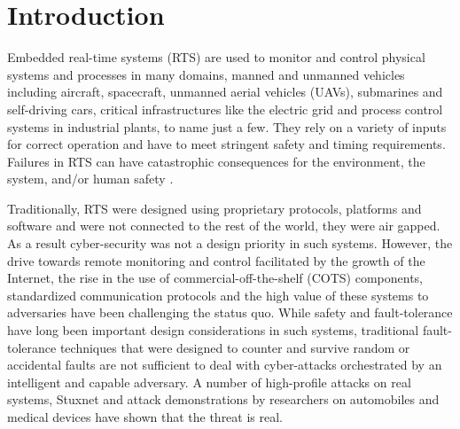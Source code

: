\documentclass[../rt_server_main.tex]{subfiles}
\begin{document}
\section{Introduction}

Embedded real-time systems (RTS) are used to monitor and control physical
systems and processes in many domains, \eg manned and unmanned vehicles
including aircraft, spacecraft, unmanned aerial vehicles (UAVs), submarines and
self-driving cars, critical infrastructures like the electric grid and process control systems in industrial plants, to name just a few.	
They rely on a variety of inputs for 
correct operation and have to meet stringent safety and timing requirements.
Failures in RTS can have catastrophic consequences for the
environment, the system, and/or human safety \cite{abrams2008malicious, checkoway2011comprehensive}. 

Traditionally, RTS were designed using proprietary protocols, platforms and software and were
not connected to the rest of the world, \ie they were air gapped. As a result cyber-security
was not a design priority in such systems.
However, the drive towards remote monitoring and control
facilitated by the growth of the Internet, the rise in the use of
commercial-off-the-shelf (COTS) components, standardized communication protocols
and the high value of these systems to adversaries have been challenging the status
quo. While safety and fault-tolerance have long been important design
considerations in such systems, traditional fault-tolerance techniques that
were designed to counter and survive random or accidental faults are not
sufficient to deal with cyber-attacks orchestrated by an intelligent and
capable adversary. A number of high-profile attacks on real systems, \eg Stuxnet \cite{stuxnet} and attack demonstrations by researchers on
automobiles \cite{ris_rts_1, checkoway2011comprehensive} and medical devices
\cite{security_medical} have shown that the threat is real. %
\end{document}
